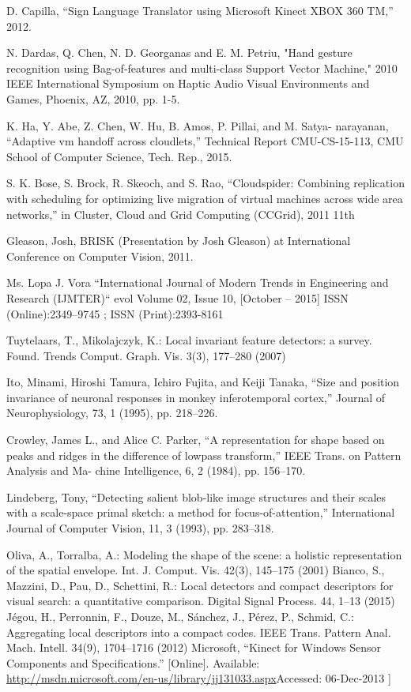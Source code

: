 \documentclass{report}           %
\begin{document}
\begin{thebibliography}{80}
 D. Capilla, “Sign Language Translator using Microsoft Kinect XBOX 360 TM,” 2012. 


N. Dardas, Q. Chen, N. D. Georganas and E. M. Petriu, "Hand gesture recognition using Bag-of-features and multi-class Support Vector Machine," 2010 IEEE International Symposium on Haptic Audio Visual Environments and Games, Phoenix, AZ, 2010, pp. 1-5.






 K. Ha, Y. Abe, Z. Chen, W. Hu, B. Amos, P. Pillai, and M. Satya- narayanan, “Adaptive vm handoff across cloudlets,” Technical Report CMU-CS-15-113, CMU School of Computer Science, Tech. Rep., 2015.

 S. K. Bose, S. Brock, R. Skeoch, and S. Rao, “Cloudspider: Combining replication with scheduling for optimizing live migration of virtual machines across wide area networks,” in Cluster, Cloud and Grid Computing (CCGrid), 2011 11th

  Gleason, Josh, BRISK (Presentation by Josh Gleason) at International Conference on
Computer Vision, 2011.

  Ms. Lopa J. Vora “International Journal of Modern Trends in Engineering and Research (IJMTER)“ evol Volume 02, Issue 10, [October – 2015] ISSN (Online):2349–9745 ; ISSN (Print):2393-8161

 Tuytelaars, T., Mikolajczyk, K.: Local invariant feature detectors: a survey. Found. Trends
Comput. Graph. Vis. 3(3), 177–280 (2007)

  Ito, Minami, Hiroshi Tamura, Ichiro Fujita, and Keiji
Tanaka, “Size and position invariance of neuronal responses
in monkey inferotemporal cortex,”
Journal of Neurophysiology, 73, 1 (1995), pp. 218–226.


 Crowley, James L., and Alice C. Parker, “A representation
for shape based on peaks and ridges in the difference of lowpass
transform,”
IEEE Trans. on Pattern Analysis and Ma-
chine Intelligence,
6, 2 (1984), pp. 156–170.

Lindeberg, Tony, “Detecting salient blob-like image structures and their scales with a scale-space primal sketch:
a method for focus-of-attention,”
International Journal of
Computer Vision,
11, 3 (1993), pp. 283–318.



 Oliva, A., Torralba, A.: Modeling the shape of the scene: a holistic representation of the spatial
envelope. Int. J. Comput. Vis. 42(3), 145–175 (2001)
 Bianco, S., Mazzini, D., Pau, D., Schettini, R.: Local detectors and compact descriptors for
visual search: a quantitative comparison. Digital Signal Process. 44, 1–13 (2015)
 Jégou, H., Perronnin, F., Douze, M., Sánchez, J., Pérez, P., Schmid, C.: Aggregating local
descriptors into a compact codes. IEEE Trans. Pattern Anal. Mach. Intell. 34(9), 1704–1716
(2012)
Microsoft, “Kinect for Windows Sensor Components and Specifications.” [Online]. Available: \url{http://msdn.microsoft.com/en-us/library/jj131033.aspx}Accessed: 06-Dec-2013 ]


\end{thebibliography}
\end{document}
